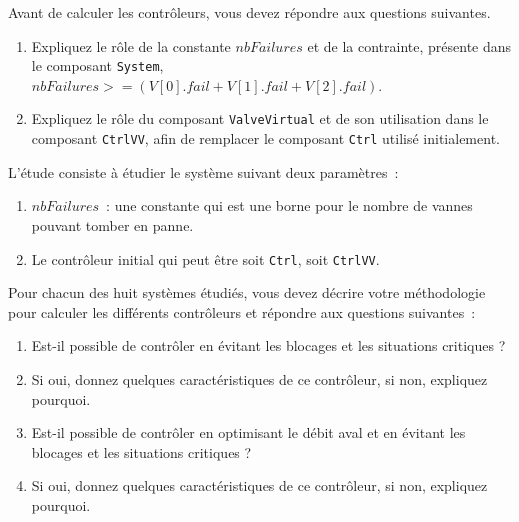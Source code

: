 Avant de calculer les contrôleurs, vous devez répondre aux questions suivantes.
\begin{enumerate}
\item Expliquez le rôle de la constante $nbFailures$ et de la contrainte, présente dans le composant {\tt System}, $nbFailures >= (V[0].fail + V[1].fail + V[2].fail)$.
\item Expliquez le rôle du composant {\tt ValveVirtual} et de son utilisation dans le composant {\tt CtrlVV}, afin de remplacer le composant {\tt Ctrl} utilisé initialement.
\end{enumerate}

L'étude consiste à étudier le système suivant deux paramètres~:
\begin{enumerate}
\item $nbFailures$~: une constante qui est une borne pour le nombre de vannes pouvant tomber en panne.
\item Le contrôleur initial qui peut être soit {\tt Ctrl}, soit {\tt CtrlVV}.
\end{enumerate}

Pour chacun des huit systèmes étudiés, vous devez décrire votre méthodologie pour calculer les différents contrôleurs et répondre aux questions suivantes~:

\begin{enumerate}
\item Est-il possible de contrôler en évitant les blocages et les situations critiques ?
\item Si oui, donnez quelques caractéristiques de ce contrôleur, si non, expliquez pourquoi.
\item Est-il possible de contrôler en optimisant le débit aval et en évitant les blocages et les situations critiques ?
\item Si oui, donnez quelques caractéristiques de ce contrôleur, si non, expliquez pourquoi.
\end{enumerate}
